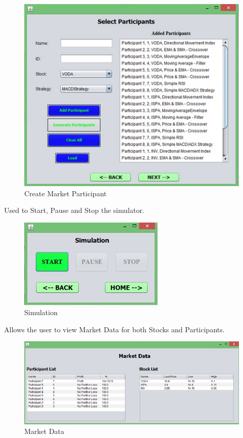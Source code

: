 \documentclass[12pt]{article}
\begin{document}
            
		\begin{figure}[h!]
		\centering
		\includegraphics[scale=0.8]{addparticipants}
		\caption{Create Market Participant}
		\label{Create Market Participant}
		\end{figure}

    Used to Start, Pause and Stop the simulator.

\pagebreak            
\begin{figure}[h!]
\centering
\includegraphics[scale=0.8]{simulation}
\caption{Simulation}
\label{Simulation}
\end{figure}

Allows the user to view Market Data for both Stocks and Participants.

\begin{figure}[h!]
\centering
\includegraphics[scale=0.8]{marketdata}
\caption{Market Data}
\label{Market Data}
\end{figure}
        
\end{document}
